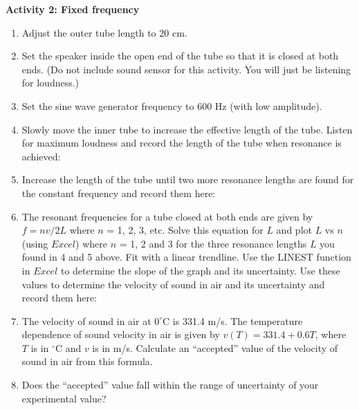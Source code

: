 {\noindent \bf Activity 2: Fixed frequency} \begin{enumerate}

\item Adjust the outer tube length to 20 cm.

\item Set the speaker inside the open end of the tube so that it is closed at both ends. (Do not include sound sensor for this activity. You will just be listening for loudness.)

\item Set the sine wave generator frequency to 600 Hz (with low amplitude).

\item Slowly move the inner tube to increase the effective length of the tube. Listen for maximum loudness and record the length of the tube when resonance is achieved:\vspace{10mm}

\item Increase the length of the tube until two more resonance lengths are found for the constant frequency and record them here:\vspace{10mm}


\item The resonant frequencies for a tube closed at both ends are given by 
$f=nv/2L$ where $n$ = 1, 2, 3, etc. Solve this equation for $L$ and plot $L$ 
vs $n$ (using $Excel$) where $n$ = 1, 2 and 3 for the three resonance lengths 
$L$
you found in 4 and 5 above. Fit with a linear trendline. Use the LINEST function in $Excel$ to determine the slope of the graph and its uncertainty. Use these values to determine the velocity of sound in air and its uncertainty and record them here:

\vspace{20mm}

\item The velocity of sound in air at $0^\circ$C is 331.4 m/s.  The temperature dependence of sound velocity in air is given by $v(T) = 331.4 + 0.6T$, where $T$ is in $^\circ$C and $v$ is in m/s. Calculate an ``accepted'' value of the velocity of sound in air from this formula.

\vspace{20mm}

\item Does the ``accepted'' value fall within the range of uncertainty of your experimental value?

\end{enumerate}
